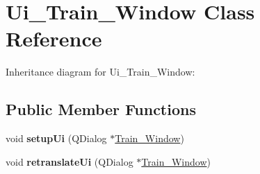 \hypertarget{classUi__Train__Window}{}\section{Ui\+\_\+\+Train\+\_\+\+Window Class Reference}
\label{classUi__Train__Window}


Inheritance diagram for Ui\+\_\+\+Train\+\_\+\+Window\+:
\subsection*{Public Member Functions}
\begin{DoxyCompactItemize}
\item 
\mbox{\label{classUi__Train__Window_aaa342eba97ba8fac78bcd23be280a4e1}} 
void {\bfseries setup\+Ui} (Q\+Dialog $\ast$\hyperlink{classTrain__Window}{Train\+\_\+\+Window})
\item 
\mbox{\label{classUi__Train__Window_aa6fd5c0f33b6f7de0707608d0a9a7ffc}} 
void {\bfseries retranslate\+Ui} (Q\+Dialog $\ast$\hyperlink{classTrain__Window}{Train\+\_\+\+Window})
\end{DoxyCompactItemize}
